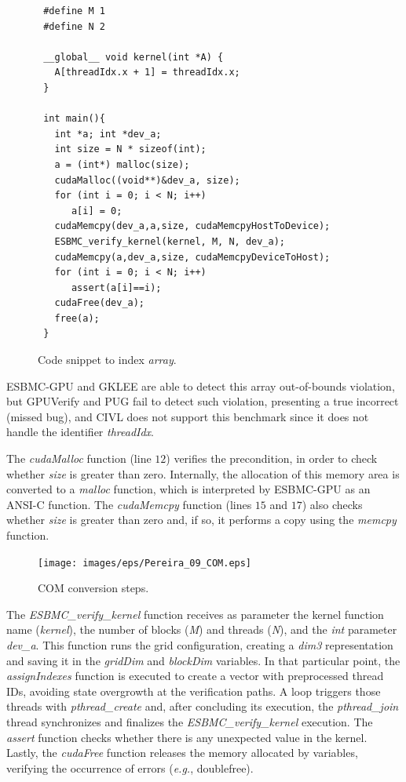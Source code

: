 \documentclass[times, doublespace]{cpeauth}
\begin{document}
 \begin{figure} [ht]
 \centering
 \begin{minipage}{0.9\textwidth}
 \begin{lstlisting}
 #define M 1
 #define N 2
 
 __global__ void kernel(int *A) {
   A[threadIdx.x + 1] = threadIdx.x;
 }
 
 int main(){
   int *a; int *dev_a;
   int size = N * sizeof(int);
   a = (int*) malloc(size);
   cudaMalloc((void**)&dev_a, size);
   for (int i = 0; i < N; i++)
      a[i] = 0;
   cudaMemcpy(dev_a,a,size, cudaMemcpyHostToDevice);
   ESBMC_verify_kernel(kernel, M, N, dev_a);
   cudaMemcpy(a,dev_a,size, cudaMemcpyDeviceToHost);
   for (int i = 0; i < N; i++)
      assert(a[i]==i);
   cudaFree(dev_a);
   free(a);
 }
 \end{lstlisting}
 \end{minipage}
 \caption{Code snippet to index \textit{array}.}
 \label{fig:FigExVerify}
 \end{figure}

ESBMC-GPU and GKLEE are able to detect this array out-of-bounds violation, but GPUVerify and PUG fail to detect such violation, presenting a true incorrect (missed bug), and CIVL does not support this benchmark since it does not handle the identifier \textit{threadIdx}.

The \textit{cudaMalloc} function (line $12$) verifies the precondition, in order to check whether \textit{size} is greater than zero. Internally, the allocation of this memory area is converted to a \textit{malloc} function, which is interpreted by ESBMC-GPU as an ANSI-C function. The \textit{cudaMemcpy} function (lines $15$ and $17$) also checks whether \textit{size} is greater than zero and, if so, it performs a copy using the \textit{memcpy} function.

\begin{figure}[htb]
\lstset{basicstyle=\scriptsize}
\center
\texttt{[image: images/eps/Pereira\_09\_COM.eps]}
\caption{COM conversion steps.}
\label{fig:egpu-verify-arc}
\end{figure}

The \textit{ESBMC\_verify\_kernel} function receives as parameter the kernel function name (\textit{kernel}), the number of blocks (\textit{M}) and threads (\textit{N}), and the \textit{int} parameter \textit{dev\_a}. This function runs the grid configuration, creating a \textit{dim3} representation and saving it in the \textit{gridDim} and \textit{blockDim} variables. In that particular point, the \textit{assignIndexes} function is executed to create a vector with preprocessed thread IDs, avoiding state overgrowth at the verification paths. A loop triggers those threads with \textit{pthread\_create} and, after concluding its execution, the \textit{pthread\_join} thread synchronizes and finalizes the \textit{ESBMC\_verify\_kernel} execution. The \textit{assert} function checks whether there is any unexpected value in the kernel. Lastly, the \textit{cudaFree} function releases the memory allocated by variables, verifying the occurrence of errors ({\it e.g.}, doublefree).
\end{document}
